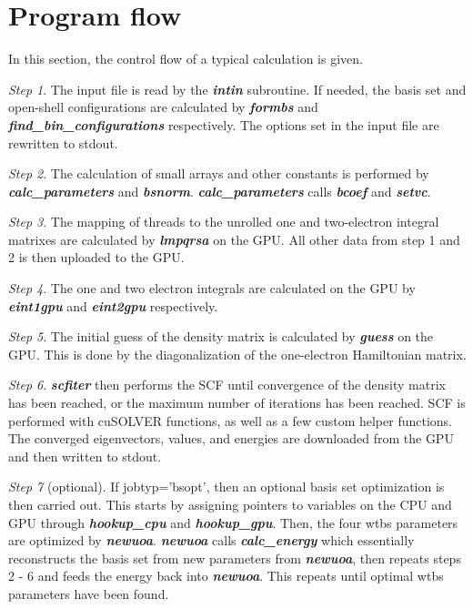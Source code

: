 \documentclass[12pt]{report}
\begin{document}
\section{Program flow}
In this section, the control flow of a typical calculation is given.

\textit{Step 1}. The input file is read by the \textit{\textbf{intin}} subroutine. If needed, the basis set and open-shell configurations are calculated by \textit{\textbf{formbs}} and \textit{\textbf{find\_bin\_configurations}} respectively. The options set in the input file are rewritten to stdout.

\textit{Step 2}. The calculation of small arrays and other constants is performed by \textit{\textbf{calc\_parameters}} and \textit{\textbf{bsnorm}}. \textit{\textbf{calc\_parameters}} calls \textit{\textbf{bcoef}} and \textit{\textbf{setvc}}.

\textit{Step 3}. The mapping of threads to the unrolled one and two-electron integral matrixes are calculated by \textit{\textbf{lmpqrsa}} on the GPU. All other data from step 1 and 2 is then uploaded to the GPU.

\textit{Step 4}. The one and two electron integrals are calculated on the GPU by \textit{\textbf{eint1gpu}} and \textit{\textbf{eint2gpu}} respectively.

\textit{Step 5}. The initial guess of the density matrix is calculated by \textit{\textbf{guess}} on the GPU. This is done by the diagonalization of the one-electron Hamiltonian matrix.

\textit{Step 6}. \textit{\textbf{scfiter}} then performs the SCF until convergence of the density matrix has been reached, or the maximum number of iterations has been reached. SCF is performed with cuSOLVER functions, as well as a few custom helper functions. The converged eigenvectors, values, and energies are downloaded from the GPU and then written to stdout.

\textit{Step 7} (optional). If jobtyp='bsopt', then an optional basis set optimization is then carried out. This starts by assigning pointers to variables on the CPU and GPU through \textit{\textbf{hookup\_cpu}} and \textit{\textbf{hookup\_gpu}}. Then, the four wtbs parameters are optimized by \textit{\textbf{newuoa}}. \textit{\textbf{newuoa}} calls \textit{\textbf{calc\_energy}} which essentially reconstructs the basis set from new parameters from \textit{\textbf{newuoa}}, then repeats steps 2 - 6 and feeds the energy back into \textit{\textbf{newuoa}}. This repeats until optimal wtbs parameters have been found.
\end{document}
